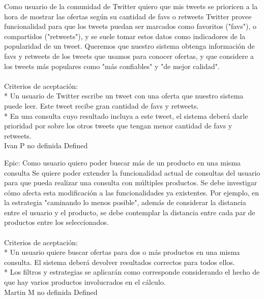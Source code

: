 	{Como usuario de la comunidad de Twitter quiero que mis tweets se prioricen a la hora de mostrar las ofertas según su cantidad de favs o retweets} %
	{Twitter provee funcionalidad para que los tweets puedan ser marcados como
favoritos ("favs"), o compartidos ("retweets"), y se suele tomar estos datos
como indicadores de la popularidad de un tweet. Queremos que nuestro sistema
obtenga información de favs y retweets de los tweets que usamos para conocer
ofertas, y que considere a los tweets más populares como "más confiables" y
"de mejor calidad".\\
  \\
Criterios de aceptación:\\
* Un usuario de Twitter escribe un tweet con una oferta que nuestro sistema puede leer. Este tweet recibe gran cantidad de favs y retweets.  \\
* En una consulta cuyo resultado incluya a este tweet, el sistema deberá darle prioridad por sobre los otros tweets que tengan menor cantidad de favs y retweets.\\
} %
	{} %
	{} %
	{Ivan P} %
	{no definida} %
	{Defined} %


\vspace{20pt}

	{Epic: Como usuario quiero poder buscar más de un producto en una misma consulta} %
	{Se quiere poder extender la funcionalidad actual de consultas del usuario para
que pueda realizar una consulta con múltiples productos. Se debe investigar
cómo afecta esta modificación a las funcionalidades ya existentes. Por
ejemplo, en la estrategia "caminando lo menos posible", además de considerar
la distancia entre el usuario y el producto, se debe contemplar la distancia
entre cada par de productos entre los seleccionados.\\
  \\
Criterios de aceptación:\\
* Un usuario quiere buscar ofertas para dos o más productos en una misma consulta. El sistema deberá devolver resultados correctos para todos ellos.  \\
* Los filtros y estrategias se aplicarán como corresponde considerando el hecho de que hay varios productos involucrados en el cálculo.\\
} %
	{} %
	{} %
	{Martin M} %
	{no definida} %
	{Defined} %


\vspace{20pt}

